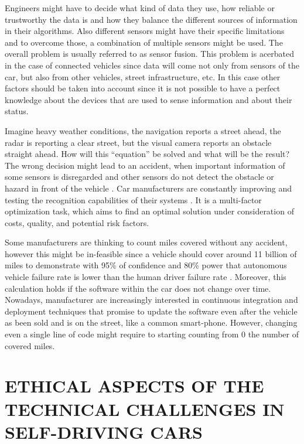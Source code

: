 Engineers might have to decide what kind of data they use, how reliable or trustworthy the data is and how they balance the different sources of information in their algorithms. Also different sensors might have their specific limitations and to overcome those, a combination of multiple sensors might be used. The overall problem is usually referred to as sensor fusion. This problem is acerbated in the case of connected vehicles since data will come not only from sensors of the car, but also from other vehicles, street infrastructure, etc. In this case other factors should be taken into account since it is not possible to have a perfect knowledge about the devices that are used to sense information and about their status.

Imagine heavy weather conditions, the navigation reports a street ahead, the radar is reporting a clear street, but the visual camera reports an obstacle straight ahead. How will this \enquote{equation} be solved and what will be the result? The wrong decision might lead to an accident, when important information of some sensors is disregarded and other sensors do not detect the obstacle or hazard in front of the vehicle \cite{Tesla2016_tragicloss}. Car manufacturers are constantly improving and testing the recognition capabilities of their systems \cite{Tesla2016_upgrade}. It is a multi-factor optimization task, which aims to find an optimal solution under consideration of costs, quality, and potential risk factors.

Some manufacturers are thinking to count miles covered without any accident, however this might be in-feasible since a vehicle should cover around 11 billion of miles to demonstrate with 95\% of confidence and 80\% power that autonomous vehicle failure rate is lower than the human driver failure rate \cite{KALRA2016182}. Moreover, this calculation holds if the software within the car does not change over time. Nowadays, manufacturer are increasingly interested in continuous integration and deployment techniques that promise to update the software even after the vehicle as been sold and is on the street, like a common smart-phone. However, changing even a single line of code might require to starting counting from 0 the number of covered miles.


\section{ETHICAL ASPECTS OF THE TECHNICAL CHALLENGES IN SELF-DRIVING CARS}
\label{sec:EAofTC}

